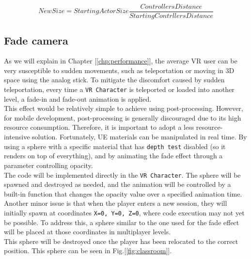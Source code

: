\begin{equation}
    \label{math:ratio}
    New Size=Starting Actor Size \frac{Controllers Distance}{Starting Contrllers Distance}
\end{equation}

\subsection{Fade camera}
\label{Chp:fade}
\noindent
As we will explain in Chapter [\ref{chp:performance}], the average \ac{VR} user can be very susceptible to sudden movements, such as teleportation or moving in 3D space using the analog stick.
To mitigate the discomfort caused by sudden teleportation, every time a \texttt{VR Character} is teleported or loaded into another level, a fade-in and fade-out animation is applied.\\
This effect would be relatively simple to achieve using post-processing. However, for mobile development, post-processing is generally discouraged due to its high resource consumption. Therefore, it is important to adopt a less resource-intensive solution. Fortunately, \ac{UE} materials can be manipulated in real time.
By using a sphere with a specific material that has \texttt{depth test} disabled (so it renders on top of everything), and by animating the fade effect through a parameter controlling opacity.\\
The code will be implemented directly in the \texttt{VR Character}. The sphere will be spawned and destroyed as needed, and the animation will be controlled by a built-in function that changes the opacity value over a specified animation time.\\
Another minor issue is that when the player enters a new session, they will initially spawn at coordinates \texttt{X=0, Y=0, Z=0}, where code execution may not yet be possible. To address this, a sphere similar to the one used for the fade effect will be placed at those coordinates in multiplayer levels.\\
This sphere will be destroyed once the player has been relocated to the correct position. This sphere can be seen in Fig.[\ref{fig:classroom}].


